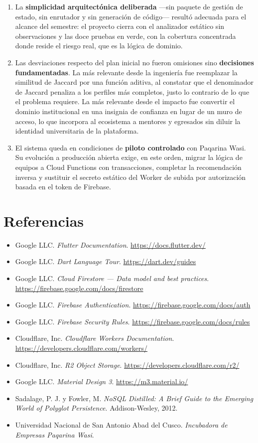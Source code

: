 \documentclass[12pt,a4paper]{article}
\begin{document}
\begin{enumerate}
    \item La \textbf{simplicidad arquitectónica deliberada} ---sin paquete de gestión de estado, sin enrutador y sin generación de código--- resultó adecuada para el alcance del semestre: el proyecto cierra con el analizador estático sin observaciones y las doce pruebas en verde, con la cobertura concentrada donde reside el riesgo real, que es la lógica de dominio.

    \item Las desviaciones respecto del plan inicial no fueron omisiones sino \textbf{decisiones fundamentadas}. La más relevante desde la ingeniería fue reemplazar la similitud de Jaccard por una función aditiva, al constatar que el denominador de Jaccard penaliza a los perfiles más completos, justo lo contrario de lo que el problema requiere. La más relevante desde el impacto fue convertir el dominio institucional en una insignia de confianza en lugar de un muro de acceso, lo que incorpora al ecosistema a mentores y egresados sin diluir la identidad universitaria de la plataforma.

    \item El sistema queda en condiciones de \textbf{piloto controlado} con Paqarina Wasi. Su evolución a producción abierta exige, en este orden, migrar la lógica de equipos a Cloud Functions con transacciones, completar la recomendación inversa y sustituir el secreto estático del Worker de subida por autorización basada en el token de Firebase.
\end{enumerate}

\newpage
\section{Referencias}
\begin{itemize}[leftmargin=*]
    \item Google LLC. \emph{Flutter Documentation}. \url{https://docs.flutter.dev/}
    \item Google LLC. \emph{Dart Language Tour}. \url{https://dart.dev/guides}
    \item Google LLC. \emph{Cloud Firestore --- Data model and best practices}. \url{https://firebase.google.com/docs/firestore}
    \item Google LLC. \emph{Firebase Authentication}. \url{https://firebase.google.com/docs/auth}
    \item Google LLC. \emph{Firebase Security Rules}. \url{https://firebase.google.com/docs/rules}
    \item Cloudflare, Inc. \emph{Cloudflare Workers Documentation}. \url{https://developers.cloudflare.com/workers/}
    \item Cloudflare, Inc. \emph{R2 Object Storage}. \url{https://developers.cloudflare.com/r2/}
    \item Google LLC. \emph{Material Design 3}. \url{https://m3.material.io/}
    \item Sadalage, P. J. y Fowler, M. \emph{NoSQL Distilled: A Brief Guide to the Emerging World of Polyglot Persistence}. Addison-Wesley, 2012.
    \item Universidad Nacional de San Antonio Abad del Cusco. \emph{Incubadora de Empresas Paqarina Wasi}.
\end{itemize}
\end{document}
